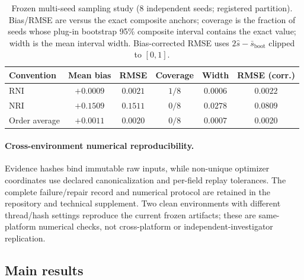 \begin{table}[htbp]
\centering\small
\caption{Frozen multi-seed sampling study (8 independent seeds;
registered partition). Bias/RMSE are versus the exact composite anchors;
coverage is the fraction of seeds whose plug-in bootstrap 95\% composite
interval contains the exact value; width is the mean interval width.
Bias-corrected RMSE uses $2\hat s-\bar s_{\mathrm{boot}}$ clipped to $[0,1]$.}
\label{tab:sampling}
\begin{tabular}{@{}lccccc@{}}
\toprule
Convention & Mean bias & RMSE & Coverage & Width & RMSE (corr.) \\
\midrule
RNI & $+0.0009$ & $0.0021$ & $1/8$ & $0.0006$ & $0.0022$ \\
NRI & $+0.1509$ & $0.1511$ & $0/8$ & $0.0278$ & $0.0809$ \\
Order average & $+0.0011$ & $0.0020$ & $0/8$ & $0.0007$ & $0.0020$ \\
\bottomrule
\end{tabular}
\end{table}

\paragraph{Cross-environment numerical reproducibility.}
Evidence hashes bind immutable raw inputs, while non-unique optimizer
coordinates use declared canonicalization and per-field replay tolerances. The
complete failure/repair record and numerical protocol are retained in the
repository and technical supplement. Two clean environments with different
thread/hash settings reproduce the current frozen artifacts; these are
same-platform numerical checks, not cross-platform or independent-investigator
replication.

\subsection{Main results}\label{sec:exp-results}

